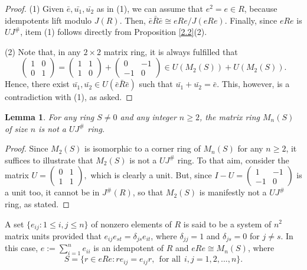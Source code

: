 \documentclass[12pt]{amsart}
\newtheorem{lemma}[theorem]{Lemma}
\theoremstyle{definition}
\begin{document}
\begin{proof}
(1) Given \( \bar{e}, \bar{u_1}, \bar{u_2} \) as in (1), we can assume that \( e^2 = e \in R \), because idempotents lift modulo \( J(R) \). Then, \( \bar{e} \bar{R} \bar{e} \cong eRe/J(eRe) \). Finally, since \( e R e \) is $UJ^{\#}$, item (1) follows directly from Proposition \ref{2.2}(2).

(2) Note that, in any \( 2 \times 2 \) matrix ring, it is always fulfilled that
		\[
		\begin{pmatrix}
			1 & 0 \\
			0 & 1
		\end{pmatrix}
		= \begin{pmatrix}
			1 & 1 \\
			1 & 0
		\end{pmatrix} + \begin{pmatrix}
			0 & -1 \\
			-1 & 0
		\end{pmatrix} \in U(M_2(S)) + U(M_2(S)).
		\]
Hence, there exist \( \bar{u_1}, \bar{u_2} \in U(\bar{e} \bar{R} \bar{e}) \) such that \( \bar{u_1} + \bar{u_2} = \bar{e} \). This, however, is a contradiction with (1), as asked.
\end{proof}

\begin{lemma}\label{matrix}
For any ring $S \neq 0$ and any integer $n \ge 2$, the matrix ring $M_n(S)$ of size $n$ is {\it not} a $UJ^{\#}$ ring.
\end{lemma}

\begin{proof}
Since $M_2(S)$ is isomorphic to a corner ring of $M_n(S)$ for any $n \ge 2$, it suffices to illustrate that $M_2(S)$ is not a $UJ^{\#}$ ring. To that aim, consider the matrix
    $U=\begin{pmatrix}
        0 & 1\\1 & 1
    \end{pmatrix},$ which is clearly a unit. But, since
    $I-U=\begin{pmatrix}
        1 & -1\\-1 & 0
    \end{pmatrix}$
is a unit too, it cannot be in $J^{\#}(R)$, so that $M_2(S)$ is manifestly not a $UJ^{\#}$ ring, as stated.
\end{proof}

A set $\{e_{ij} : 1 \le i, j \le n\}$ of nonzero elements of $R$ is said to be a system of $n^2$ matrix units provided that $e_{ij}e_{st} = \delta_{js}e_{it}$, where $\delta_{jj} = 1$ and $\delta_{js} = 0$ for $j \neq s$. In this case, $e := \sum_{i=1}^{n} e_{ii}$ is an idempotent of $R$ and $eRe \cong M_n(S)$, where $$S = \{r \in eRe : re_{ij} = e_{ij}r,~~\textrm{for all}~~ i, j = 1, 2, . . . , n\}.$$
\end{document}
